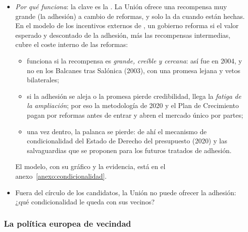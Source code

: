 \documentclass[11pt]{article}
\begin{document}
\begin{itemize}
\item \emph{Por qué funciona}: la clave es la . La Unión ofrece una recompensa muy grande (la adhesión) a cambio de reformas, y solo la da cuando están hechas. En el modelo de los incentivos externos de \textcite{SchimmelfennigSedelmeier2004}, un gobierno reforma si el valor esperado y descontado de la adhesión, más las recompensas intermedias, cubre el coste interno de las reformas:
  \begin{itemize}
  \item funciona si la recompensa es \emph{grande, creíble y cercana}: así fue en 2004, y no en los Balcanes tras Salónica (2003), con una promesa lejana y vetos bilaterales;
  \item si la adhesión se aleja o la promesa pierde credibilidad, llega la \emph{fatiga de la ampliación}; por eso la metodología de 2020 y el Plan de Crecimiento pagan por reformas antes de entrar y abren el mercado único por partes\nocite{CE2020Metodologia};
  \item una vez dentro, la palanca se pierde: de ahí el mecanismo de condicionalidad del Estado de Derecho del presupuesto (2020) y las salvaguardias que se proponen para los futuros tratados de adhesión\nocite{CE2026PaqueteAmpliacion}.
  \end{itemize}
  El modelo, con su gráfico y la evidencia, está en el anexo~\ref{anexo:condicionalidad}.
\item Fuera del círculo de los candidatos, la Unión no puede ofrecer la adhesión: ¿qué condicionalidad le queda con sus vecinos?
\end{itemize}

\subsubsection{La política europea de vecindad}\label{sec:vecindad}
\end{document}
